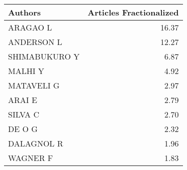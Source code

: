 
\begin{tabular}{lr}
\toprule
Authors & Articles Fractionalized\\
\midrule
ARAGAO L & 16.37\\
ANDERSON L & 12.27\\
SHIMABUKURO Y & 6.87\\
MALHI Y & 4.92\\
MATAVELI G & 2.97\\
\addlinespace
ARAI E & 2.79\\
SILVA C & 2.70\\
DE O G & 2.32\\
DALAGNOL R & 1.96\\
WAGNER F & 1.83\\
\bottomrule
\end{tabular}